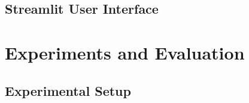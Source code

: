 \documentclass[conference]{IEEEtran}
\begin{document}


\subsection{Streamlit User Interface}
\label{sec:impl:ui}


\section{Experiments and Evaluation}
\label{sec:eval}

\subsection{Experimental Setup}
\label{sec:eval:setup}

\end{document}
